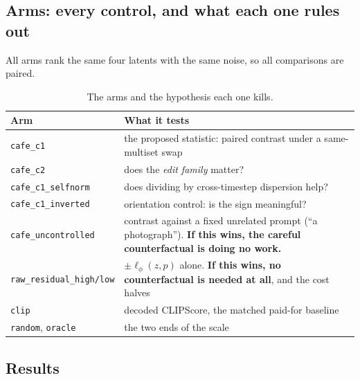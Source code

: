 \documentclass[10pt]{article}
\begin{document}
\subsection{Arms: every control, and what each one rules out}

All arms rank the same four latents with the same noise, so all comparisons are paired.

\begin{table}[h]
\centering
\caption{The arms and the hypothesis each one kills.}
\label{tab:arms}
\small
\begin{tabularx}{\textwidth}{@{}lX@{}}
\toprule
Arm & What it tests \\
\midrule
\texttt{cafe\_c1} & the proposed statistic: paired contrast under a same-multiset swap \\
\texttt{cafe\_c2} & does the \emph{edit family} matter? \\
\texttt{cafe\_c1\_selfnorm} & does dividing by cross-timestep dispersion help? \\
\texttt{cafe\_c1\_inverted} & orientation control: is the sign meaningful? \\
\texttt{cafe\_uncontrolled} & contrast against a fixed unrelated prompt (``a photograph''). \textbf{If this
  wins, the careful counterfactual is doing no work.} \\
\texttt{raw\_residual\_high/low} & $\pm\ell_\phi(z,p)$ alone. \textbf{If this wins, no counterfactual
  is needed at all}, and the cost halves \\
\texttt{clip} & decoded CLIPScore, the matched paid-for baseline \\
\texttt{random}, \texttt{oracle} & the two ends of the scale \\
\bottomrule
\end{tabularx}
\end{table}

\subsection{Results}
\end{document}
